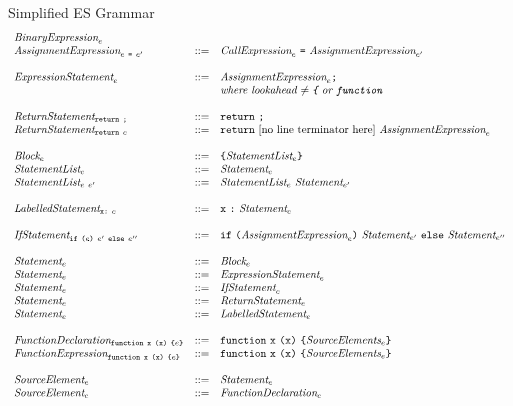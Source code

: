 \documentclass[preprint,10pt]{sigplanconf}
\begin{document}
\begin{displayfigure*}{\label{fig:grammar}Simplified ES Grammar}
\[\begin{array}{lcl}
  \textit{BinaryExpression}_{e}
  \\
  \textit{AssignmentExpression}_{e~\texttt{=}~e'} &::=&
  \textit{CallExpression}_{e}~\texttt{=}~
  \textit{AssignmentExpression}_{e'}
  \\ \\
  \textit{ExpressionStatement}_{e} &::=&
  \textit{AssignmentExpression}_{e} \texttt{;}
  \\ 
  &&  \textit{where lookahead \( \not =
    \texttt{\{} \) or \( \texttt{function} \)}
  \\ \\
  \textit{ReturnStatement}_{\texttt{return}~\texttt{;}} &::=&
  \texttt{return}~\texttt{;}
  \\
  \textit{ReturnStatement}_{\texttt{return}~e} &::=&
  \texttt{return}~\textrm{[no line terminator here]}~\textit{AssignmentExpression}_{e}
  \\ \\
  \textit{Block}_{e} &::=&
  \texttt{\{} \textit{StatementList}_{e} \texttt{\}} 
  \\
  \textit{StatementList}_{e} &::=&
  \textit{Statement}_{e}
  \\
  \textit{StatementList}_{e~e'} &::=&
  \textit{StatementList}_{e}~
  \textit{Statement}_{e'}
  \\ \\
  \textit{LabelledStatement}_{\texttt{x}\texttt{:}~e} &::=&
  \texttt{x}~\texttt{:}~\textit{Statement}_{e}
  \\ \\
  \textit{IfStatement}_{\texttt{if}~\texttt{(}e\texttt{)}~e'~\texttt{else}~e''} &::=&
  \texttt{if}~\texttt{(}\textit{AssignmentExpression}_{e}\texttt{)}~\textit{Statement}_{e'}~
  \texttt{else}~\textit{Statement}_{e''}
  \\ \\
  \textit{Statement}_{e} &::=& \textit{Block}_{e}
  \\
  \textit{Statement}_{e} &::=& \textit{ExpressionStatement}_{e}
  \\
  \textit{Statement}_{e} &::=& \textit{IfStatement}_{e}
  \\
  \textit{Statement}_{e} &::=& \textit{ReturnStatement}_{e}
  \\
  \textit{Statement}_{e} &::=& \textit{LabelledStatement}_{e}
  \\ \\
  \textit{FunctionDeclaration}_{\texttt{function}~\texttt{x}~\texttt{(}\texttt{x}\texttt{)}~\texttt{\{}e\texttt{\}}} 
  &::=&
  \texttt{function}~\texttt{x}~\texttt{(}\texttt{x}\texttt{)}~
  \texttt{\{}\textit{SourceElements}_{e}\texttt{\}}
  \\
  \textit{FunctionExpression}_{\texttt{function}~\texttt{x}~\texttt{(}\texttt{x}\texttt{)}~\texttt{\{}e\texttt{\}}} 
  &::=&
  \texttt{function}~\texttt{x}~\texttt{(}\texttt{x}\texttt{)}~
  \texttt{\{}\textit{SourceElements}_{e}\texttt{\}}
  \\ \\
  \textit{SourceElement}_{e} &::=& \textit{Statement}_{e} 
  \\
  \textit{SourceElement}_{e} &::=& \textit{FunctionDeclaration}_{e}
  \\ \\


\end{array}\]
\end{displayfigure*}
\end{document}
